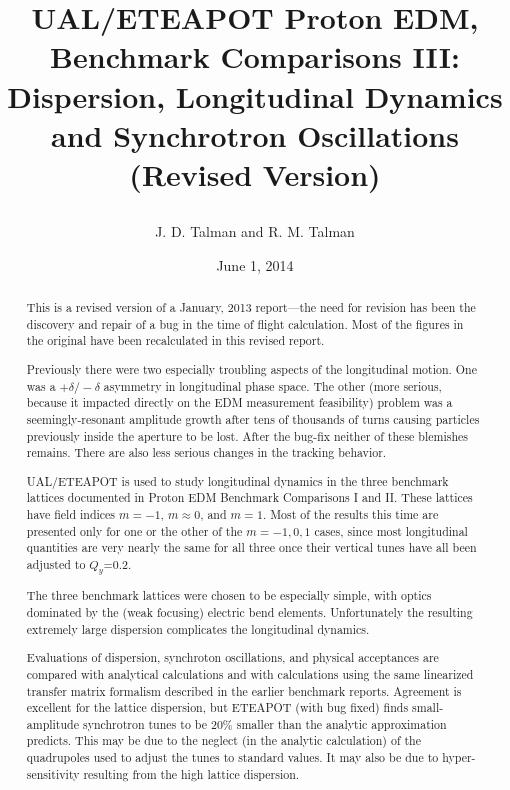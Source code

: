 \documentclass[]{article}
\begin{document}
\date{June 1, 2014}

\title{
\centerline{}
\centerline{}
\centerline{}
UAL/ETEAPOT Proton EDM, Benchmark Comparisons III: \\ 
Dispersion, Longitudinal Dynamics and Synchrotron Oscillations \\
(Revised Version)
}
\author{J. D. Talman and R. M. Talman
}

\maketitle

%
\begin{abstract}
This is a revised version of a January, 2013 report---the need for revision
has been the discovery and repair of a bug in the time of flight calculation.
Most of the figures in the original have been recalculated in this revised report.

Previously there were two especially troubling aspects of the longitudinal
motion. One was a $+\delta/-\delta$ asymmetry in longitudinal phase space.
The other (more serious, because it impacted directly on the EDM measurement 
feasibility) problem was a seemingly-resonant amplitude growth 
after tens of thousands of turns causing particles previously inside the aperture 
to be lost. After the bug-fix neither of these blemishes remains. There are
also less serious changes in the tracking behavior.

UAL/ETEAPOT is used to study longitudinal dynamics in the three benchmark lattices 
documented in Proton EDM Benchmark Comparisons I\cite{BenchmarkI}
and II\cite{BenchmarkII}.
These lattices have field indices $m=-1$, $m\approx0$, and $m=1$.  Most of the results 
this time are presented only for one or the other of the $m=-1,0,1$ cases, since most 
longitudinal quantities are very nearly the same for all three once their 
vertical tunes have all been adjusted to $Q_y$=0.2.

The three benchmark lattices were chosen to be 
especially simple, with optics dominated by the (weak focusing) electric
bend elements. Unfortunately the resulting extremely large dispersion 
complicates the longitudinal dynamics.

Evaluations of dispersion, synchroton oscillations, and physical acceptances
are compared with analytical calculations and with calculations using the same
linearized transfer matrix formalism described in the earlier 
benchmark reports\cite{BenchmarkI}\cite{BenchmarkII}.
Agreement is excellent for the lattice dispersion, but ETEAPOT (with bug
fixed) finds small-amplitude synchrotron tunes to be 20\% smaller than the analytic
approximation predicts. This may be due to the neglect (in the analytic calculation)
of the quadrupoles used to adjust the tunes to standard values.  It may
also be due to hyper-sensitivity resulting from the high lattice dispersion.


\end{abstract}
\end{document}
